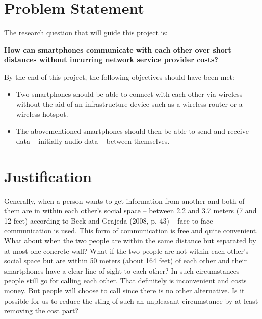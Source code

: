 \documentclass[12pt,svgnames,smaller]{article} %
\begin{document}


\section{ \textbf{ Problem Statement } } 

The research question that will guide this project is:

\textbf{ How can smartphones communicate with each other over short distances without incurring network service provider costs? }

By the end of this project, the following objectives should have been met:

\begin{itemize}
	\item Two smartphones should be able to connect with each other via wireless without the aid of an infrastructure device such as a wireless router or a wireless hotspot.
	\item The abovementioned smartphones should then be able to send and receive data – initially audio data – between themselves.
\end{itemize}




\section{ \textbf{ Justification } } 

Generally, when a person wants to get information from another and both of them are in within each other’s social space – between 2.2 and 3.7 meters (7 and 12 feet) according to Beck and Grajeda (2008, p. 43) – face to face communication is used. This form of communication is free and quite convenient. What about when the two people are within the same distance but separated by at most one concrete wall? What if the two people are not within each other’s social space but are within 50 meters (about 164 feet) of each other and their smartphones have a clear line of sight to each other? In such circumstances people still go for calling each other. That definitely is inconvenient and costs money. But people will choose to call since there is no other alternative. Is it possible for us to reduce the sting of such an unpleasant circumstance by at least removing the cost part?
\end{document}
